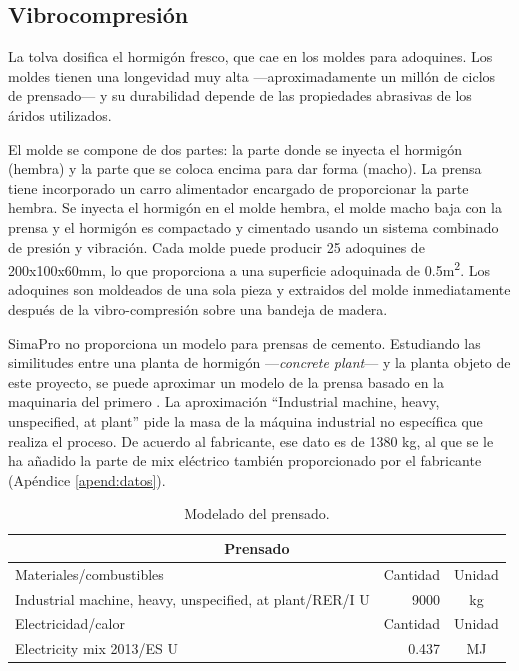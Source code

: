 \subsection{Vibrocompresión}

La tolva dosifica el hormigón fresco, que cae en los moldes para adoquines. Los moldes tienen una longevidad muy alta —aproximadamente un millón de ciclos de prensado— y su durabilidad depende de las propiedades abrasivas de los áridos utilizados.

El molde se compone de dos partes: la parte donde se inyecta el hormigón (hembra) y la parte que se coloca encima para dar forma (macho). La prensa tiene incorporado un carro alimentador encargado de proporcionar la parte hembra. Se inyecta el hormigón en el molde hembra, el molde macho baja con la prensa y el hormigón es compactado y cimentado usando un sistema combinado de presión y vibración. Cada molde puede producir 25 adoquines de 200x100x60\si{\milli\meter}, lo que proporciona a una superficie adoquinada de 0.5\si{\square\meter}. Los adoquines son moldeados de una sola pieza y extraidos del molde inmediatamente después de la vibro-compresión sobre una bandeja de madera.

SimaPro no proporciona un modelo para prensas de cemento. Estudiando las similitudes entre una planta de hormigón —\textit{concrete plant}— y la planta objeto de este proyecto, se puede aproximar un modelo de la prensa basado en la maquinaria del primero \cite{buildingproducts}. La aproximación ``Industrial machine, heavy, unspecified, at plant'' pide la masa de la máquina industrial no específica que realiza el proceso. De acuerdo al fabricante, ese dato es de 1380 \si{kg}, al que se le ha añadido la parte de mix eléctrico también proporcionado por el fabricante (Apéndice \ref{apend:datos}).

\begin{table}[!htb]
\centering
\begin{tabular}{p{8cm}rc}
\toprule
\multicolumn{3}{c}{Prensado}\\
\midrule
Materiales/combustibles & Cantidad & Unidad\\
\midrule
Industrial machine, heavy, unspecified, at plant/RER/I U & 9000 & \si{kg}\\
\midrule
Electricidad/calor & Cantidad & Unidad\\
\midrule
Electricity mix 2013/ES U & 0.437 & \si{MJ}\\
\bottomrule
\end{tabular}
\caption{Modelado del prensado.}
\label{modeladoprensado}
\end{table}

